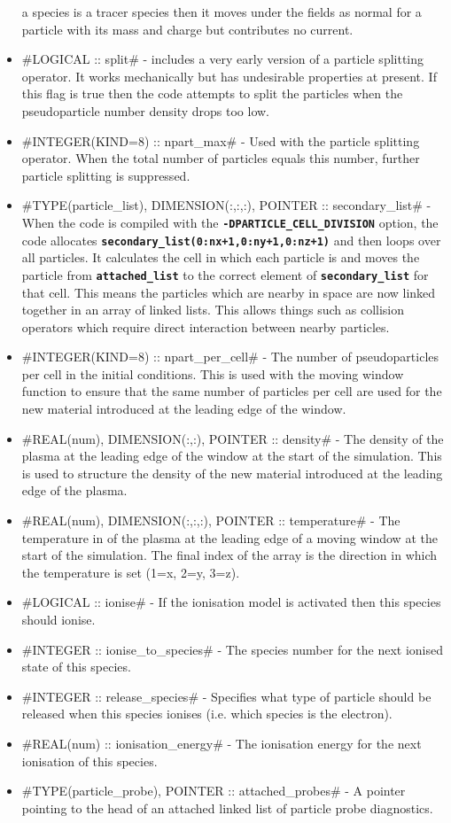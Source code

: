 \documentclass[12pt,a4paper]{article}
\newcommand{\inlinecode}[1]{{\color{warwickred} \bf\texttt{#1}}}
\newcommand{\EPOCH}{{\color{warwickdark}\fontfamily{phv}\selectfont{EPOCH}}}
\begin{document}
\begin{itemize}
  a species is a tracer species then it moves under the fields as normal for a
  particle with its mass and charge but contributes no current.
\item #LOGICAL :: split# - {\EPOCH} includes a very early version of a particle
  splitting operator. It works mechanically but has undesirable properties at
  present. If this flag is true then the code attempts to split the particles
  when the pseudoparticle number density drops too low.
\item #INTEGER(KIND=8) :: npart_max# - Used with the particle splitting
  operator. When the total number of particles equals this number, further
  particle splitting is suppressed.
\item #TYPE(particle_list), DIMENSION(:,:,:), POINTER :: secondary_list# - When
  the code is compiled with the \inlinecode{-DPARTICLE\_CELL\_DIVISION} option,
  the code allocates \inlinecode{secondary\_list(0:nx+1,0:ny+1,0:nz+1)} and then
  loops over all particles. It calculates the cell in which each particle is and
  moves the particle from \inlinecode{attached\_list} to the correct element of
  \inlinecode{secondary\_list} for that cell. This means the particles which are
  nearby in space are now linked together in an array of linked lists. This
  allows things such as collision operators which require direct interaction
  between nearby particles.
\item #INTEGER(KIND=8) :: npart_per_cell# - The number of pseudoparticles per
  cell in the initial conditions. This is used with the moving window function
  to ensure that the same number of particles per cell are used for the new
  material introduced at the leading edge of the window.
\item #REAL(num), DIMENSION(:,:), POINTER :: density# - The density of the
  plasma at the leading edge of the window at the start of the simulation. This
  is used to structure the density of the new material introduced at the leading
  edge of the plasma.
\item #REAL(num), DIMENSION(:,:,:), POINTER :: temperature# - The temperature
  in of the plasma at the leading edge of a moving window at the start of the
  simulation. The final index of the array is the direction in which the
  temperature is set (1=x, 2=y, 3=z).
\item #LOGICAL :: ionise# - If the ionisation model is activated then this
  species should ionise.
\item #INTEGER :: ionise_to_species# - The species number for the next ionised
  state of this species.
\item #INTEGER :: release_species# - Specifies what type of particle should be
  released when this species ionises (i.e. which species is the electron).
\item #REAL(num) :: ionisation_energy# - The ionisation energy for the next
  ionisation of this species.
\item #TYPE(particle_probe), POINTER :: attached_probes# - A pointer pointing to
  the head of an attached linked list of particle probe diagnostics.
\end{itemize}
\end{document}
